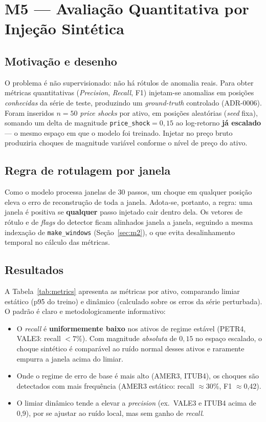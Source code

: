 \section{M5 --- Avaliação Quantitativa por Injeção Sintética}
\label{sec:m5}

\subsection{Motivação e desenho}
O problema é não supervisionado: não há rótulos de anomalia reais. Para obter
métricas quantitativas (\emph{Precision}, \emph{Recall}, F1) injetam-se anomalias em
posições \emph{conhecidas} da série de teste, produzindo um \emph{ground-truth}
controlado (ADR-0006). Foram inseridos $n=50$ \emph{price shocks} por ativo, em posições
aleatórias (\emph{seed} fixa), somando um delta de magnitude \texttt{price\_shock}$=0{,}15$
ao log-retorno \textbf{já escalado} --- o mesmo espaço em que o modelo foi treinado.
Injetar no preço bruto produziria choques de magnitude variável conforme o nível de preço
do ativo.

\subsection{Regra de rotulagem por janela}
Como o modelo processa janelas de 30 passos, um choque em qualquer posição eleva o erro de
reconstrução de toda a janela. Adota-se, portanto, a regra: uma janela é positiva se
\textbf{qualquer} passo injetado cair dentro dela. Os vetores de rótulo e de \emph{flags}
do detector ficam alinhados janela a janela, seguindo a mesma indexação de
\texttt{make\_windows} (Seção~\ref{sec:m2}), o que evita desalinhamento temporal no cálculo
das métricas.

\subsection{Resultados}
A Tabela~\ref{tab:metrics} apresenta as métricas por ativo, comparando limiar estático
(p95 do treino) e dinâmico (calculado sobre os erros da série perturbada). O padrão é
claro e metodologicamente informativo:
\begin{itemize}[noitemsep]
  \item O \emph{recall} é \textbf{uniformemente baixo} nos ativos de regime estável
        (PETR4, VALE3: recall $<7\%$). Com magnitude \emph{absoluta} de $0{,}15$ no espaço
        escalado, o choque sintético é comparável ao ruído normal desses ativos e raramente
        empurra a janela acima do limiar.
  \item Onde o regime de erro de base é mais alto (AMER3, ITUB4), os choques são detectados
        com mais frequência (AMER3 estático: recall $\approx$30\%, F1 $\approx$0{,}42).
  \item O limiar dinâmico tende a elevar a \emph{precision} (ex.\ VALE3 e ITUB4 acima de
        0{,}9), por se ajustar ao ruído local, mas sem ganho de \emph{recall}.
\end{itemize}

